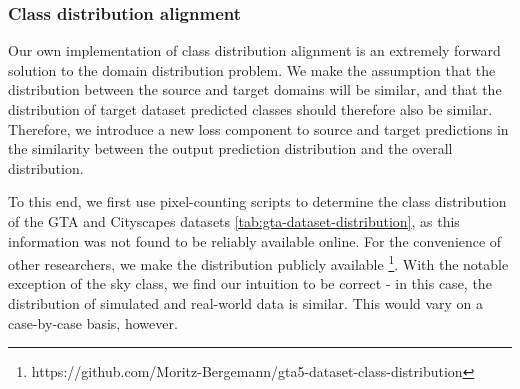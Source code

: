 \documentclass[a4paper,12pt]{report}
\begin{document}
\subsubsection{Class distribution alignment}
Our own implementation of class distribution alignment is an extremely forward solution to the domain distribution problem. We make the assumption that the distribution between the source and target domains will be similar, and that the distribution of target dataset predicted classes should therefore also be similar. Therefore, we introduce a new loss component to source and target predictions in the similarity between the output prediction distribution and the overall distribution.

To this end, we first use pixel-counting scripts to determine the class distribution of the GTA and Cityscapes datasets \ref{tab:gta-dataset-distribution}, as this information was not found to be reliably available online. For the convenience of other researchers, we make the distribution publicly available \footnote{https://github.com/Moritz-Bergemann/gta5-dataset-class-distribution}. With the notable exception of the sky class, we find our intuition to be correct - in this case, the distribution of simulated and real-world data is similar. This would vary on a case-by-case basis, however.
\end{document}
